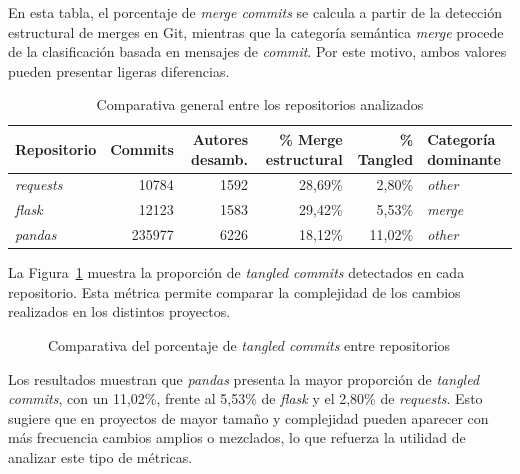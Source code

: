 \documentclass[a4paper, 12pt]{book}
\begin{document}
En esta tabla, el porcentaje de \emph{merge commits} se calcula a partir de la detección estructural de merges en Git, mientras que la categoría semántica \emph{merge} procede de la clasificación basada en mensajes de \emph{commit}. Por este motivo, ambos valores pueden presentar ligeras diferencias.

\begin{table}[H]
\centering
\small
\begin{tabular}{|p{2.5cm}|r|r|r|r|p{3cm}|}
\hline
\textbf{Repositorio} & \textbf{Commits} & \textbf{Autores desamb.} & \textbf{\% Merge estructural} & \textbf{\% Tangled} & \textbf{Categoría dominante} \\
\hline
\emph{requests} & 10784 & 1592 & 28,69\% & 2,80\% & \emph{other} \\
\hline
\emph{flask} & 12123 & 1583 & 29,42\% & 5,53\% & \emph{merge} \\
\hline
\emph{pandas} & 235977 & 6226 & 18,12\% & 11,02\% & \emph{other} \\
\hline
\end{tabular}
\caption{Comparativa general entre los repositorios analizados}
\label{tab:comparativa_repos}
\end{table}

La Figura~\ref{fig:tangled_comparativa} muestra la proporción de \emph{tangled commits} detectados en cada repositorio. Esta métrica permite comparar la complejidad de los cambios realizados en los distintos proyectos.

\begin{figure}[H]
\centering
{}
\caption{Comparativa del porcentaje de \emph{tangled commits} entre repositorios}
\label{fig:tangled_comparativa}
\end{figure}

Los resultados muestran que \emph{pandas} presenta la mayor proporción de \emph{tangled commits}, con un 11,02\%, frente al 5,53\% de \emph{flask} y el 2,80\% de \emph{requests}. Esto sugiere que en proyectos de mayor tamaño y complejidad pueden aparecer con más frecuencia cambios amplios o mezclados, lo que refuerza la utilidad de analizar este tipo de métricas.
\end{document}
